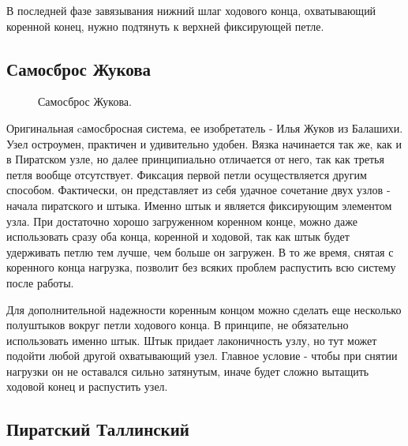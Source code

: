 В последней фазе завязывания нижний шлаг ходового конца, охватывающий коренной конец, нужно подтянуть к верхней фиксирующей петле.

\subsection{Самосброс Жукова}

\begin{figure}[H]\centering
	\subfloat[Завязывание]{\label{ris:Zhukov_1}
	\tcbox[enhanced jigsaw,colframe=black,opacityframe=0.5,opacityback=0.5,height=6.5cm]
		{\centering
			}
		}
\hfil
	\subfloat[Завязывание]{\label{ris:Zhukov_2}
	\tcbox[enhanced jigsaw,colframe=black,opacityframe=0.5,opacityback=0.5,height=6.5cm]
		{\centering
			}
		}
\hfil
	\subfloat[Результат]{\label{ris:Zhukov_3}
	\tcbox[enhanced jigsaw,colframe=black,opacityframe=0.5,opacityback=0.5]
		{\centering
			}
		}
	\caption{Самосброс Жукова.}\label{ris:Zhukov}
\end{figure}

Оригинальная cамосбросная система, ее изобретатель - Илья Жуков из Балашихи. Узел остроумен, практичен и удивительно удобен. Вязка начинается так же, как и в Пиратском узле, но далее принципиально отличается от него, так как третья петля вообще отсутствует. Фиксация первой петли осуществляется другим способом. Фактически, он представляет из себя удачное сочетание двух узлов - начала пиратского и штыка. Именно штык и является фиксирующим элементом узла. При достаточно хорошо загруженном коренном конце, можно даже использовать сразу оба конца, коренной и ходовой, так как штык будет удерживать петлю тем лучше, чем больше он загружен. В то же время, снятая с коренного конца нагрузка, позволит без всяких проблем распустить всю систему после работы.

Для дополнительной надежности коренным концом можно сделать еще несколько полуштыков вокруг петли ходового конца. В принципе, не обязательно использовать именно штык. Штык придает лаконичность узлу, но тут может подойти любой другой охватывающий узел. Главное условие - чтобы при снятии нагрузки он не оставался сильно затянутым, иначе будет сложно вытащить ходовой конец и распустить узел.

\subsection{Пиратский Таллинский}


